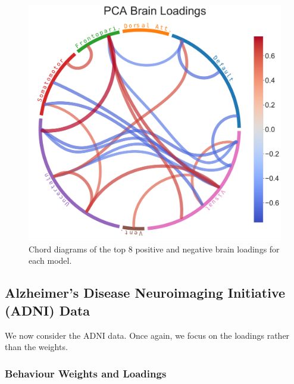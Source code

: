 \begin{figure}
\includegraphics[width=0.49\linewidth]{figures/hcp/PCA brain loadings}
\caption{Chord diagrams of the top 8 positive and negative brain loadings for each model.}\label{fig:chord_loadings}
\end{figure}

\newpage
\subsection{Alzheimer's Disease Neuroimaging Initiative (ADNI) Data}

We now consider the ADNI data.
Once again, we focus on the loadings rather than the weights.

\subsubsection{Behaviour Weights and Loadings}



